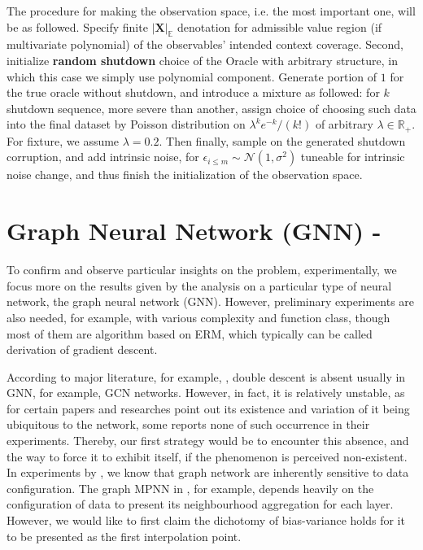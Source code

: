 The procedure for making the observation space, i.e. the most important one, will be as followed. Specify finite $|\mathbf{X}|_{\mathbb{E}}$ denotation for admissible value region (if multivariate polynomial) of the observables' intended context coverage. Second, initialize \textbf{random shutdown} choice of the Oracle with arbitrary structure, in which this case we simply use polynomial component. Generate portion of $1$ for the true oracle without shutdown, and introduce a mixture as followed: for $k$ shutdown sequence, more severe than another, assign choice of choosing such data into the final dataset by Poisson distribution on $\lambda^{k}e^{-k}/(k!)$ of arbitrary $\lambda\in\mathbb{R}_{+}$. For fixture, we assume $\lambda=0.2$. Then finally, sample on the generated shutdown corruption, and add intrinsic noise, for $\epsilon_{i\leq m}\sim \mathcal{N}(1,\sigma^{2})$ tuneable for intrinsic noise change, and thus finish the initialization of the observation space.

\clearpage


\section{Graph Neural Network (GNN) - \cite{shi2024homophilymodulatesdoubledescent}}
To confirm and observe particular insights on the problem, experimentally, we focus more on the results given by the analysis on a particular type of neural network, the graph neural network (GNN). However, preliminary experiments are also needed, for example, with various complexity and function class, though most of them are algorithm based on ERM, which typically can be called derivation of gradient descent. 

According to major literature, for example, \cite{shi2024homophilymodulatesdoubledescent}, double descent is absent usually in GNN, for example, GCN networks. However, in fact, it is relatively unstable, as for certain papers and researches point out its existence and variation of it being ubiquitous to the network, some reports none of such occurrence in their experiments. Thereby, our first strategy would be to encounter this absence, and the way to force it to exhibit itself, if the phenomenon is perceived non-existent. In experiments by \cite{shi2024homophilymodulatesdoubledescent,buschjager_generalized_2020}, we know that graph network are inherently sensitive to data configuration. The graph MPNN in \cite{GRP_Hamilton}, for example, depends heavily on the configuration of data to present its neighbourhood aggregation for each layer. However, we would like to first claim the dichotomy of bias-variance holds for it to be presented as the first interpolation point.

